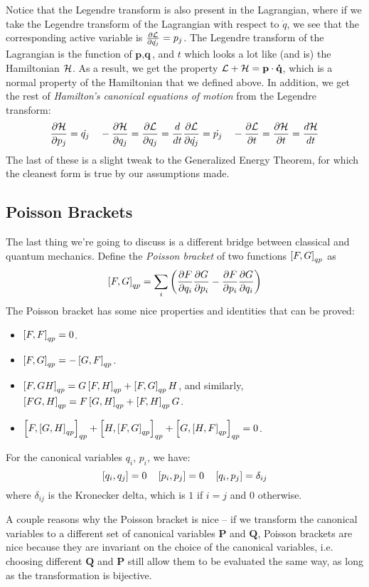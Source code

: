 Notice that the Legendre transform is also present in the Lagrangian, where if we take the Legendre transform of the Lagrangian with respect to $\dot{q}$, we see that the corresponding active variable is $\frac{\partial \mathcal{L}}{\partial \dot{q_j}} = p_j$. The Legendre transform of the Lagrangian is the function of $\textbf{p}, \textbf{q}$, and $t$ which looks a lot like (and is) the Hamiltonian $\mathcal{H}$. As a result, we get the property $\mathcal{L} + \mathcal{H} = \textbf{p} \cdot \mathbf{\dot{q}}$, which is a normal property of the Hamiltonian that we defined above. In addition, we get the rest of \textit{Hamilton's canonical equations of motion} from the Legendre transform: 
\[
	\frac{\partial \mathcal{H}}{\partial p_j} = \dot{q_j} \quad -\frac{\partial \mathcal{H}}{\partial q_j} = \frac{\partial \mathcal{L}}{\partial q_j} = \frac{d }{d t} \frac{\partial \mathcal{L}}{\partial \dot{q_j}} = \dot{p_j} \quad -\frac{\partial \mathcal{L}}{\partial t} = \frac{\partial \mathcal{H}}{\partial t} = \frac{d \mathcal{H}}{d t}
\]
The last of these is a slight tweak to the Generalized Energy Theorem, for which the cleanest form is true by our assumptions made. 

\subsection{Poisson Brackets}
The last thing we're going to discuss is a different bridge between classical and quantum mechanics. Define the \textit{Poisson bracket} of two functions $\left[F, G\right]_{qp}$ as
\[
	\left[F, G\right]_{qp} = \sum_i \left( \frac{\partial F}{\partial q_i} \frac{\partial G}{\partial p_i} - \frac{\partial F}{\partial p_i} \frac{\partial G}{\partial q_i} \right)
\]
The Poisson bracket has some nice properties and identities that can be proved:  
\begin{itemize}
\item $\left[F, F\right]_{qp} = 0$. 
\item $\left[F, G\right]_{qp} = -\left[G, F\right]_{qp}$. 
\item $\left[F, GH\right]_{qp} = G\left[F, H\right]_{qp} + \left[F, G\right]_{qp}H$, and similarly, $\left[FG, H\right]_{qp} = F\left[G, H\right]_{qp} + \left[F, H\right]_{qp}G$.
\item $\left[F, \left[G, H\right]_{qp}\right]_{qp} + \left[H, \left[F, G\right]_{qp}\right]_{qp} + \left[G, \left[H, F\right]_{qp}\right]_{qp} = 0$.
\end{itemize}
For the canonical variables $q_i$, $p_i$, we have: 
\[
	\left[q_i, q_j\right] = 0 \quad \left[p_i, p_j\right] = 0 \quad \left[q_i, p_j\right] = \delta_{ij}
\]
where $\delta_{ij}$ is the Kronecker delta, which is $1$ if $i = j$ and 0 otherwise. 

A couple reasons why the Poisson bracket is nice -- if we transform the canonical variables to a different set of canonical variables $\textbf{P}$ and $\mathbf{Q}$, Poisson brackets are nice because they are invariant on the choice of the canonical variables, i.e. choosing different $\mathbf{Q}$ and $\mathbf{P}$ still allow them to be evaluated the same way, as long as the transformation is bijective. 

